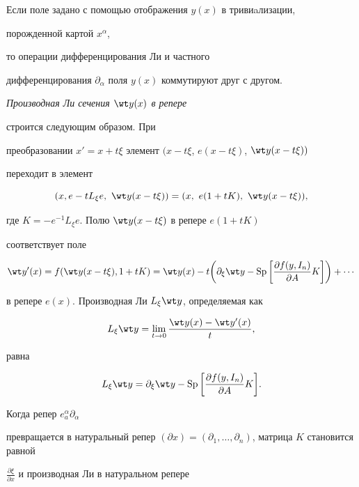 \begin{thm}


Если поле задано с помощью отображения $y(x)$ в тривиaлизации, 


порожденной картой $x^\alpha$,


то операции дифференцирования Ли и частного


дифференцирования $\partial_\alpha$ поля $y(x)$ коммутируют друг с другом.


\end{thm}





{\it Производная Ли сечения $\wt y(x)$ в репере} 


строится следующим образом. При 


преобразовании $x'=x+t\xi$ элемент $(x-t\xi$, $e(x-t\xi)$, $\wt y(x-t\xi))$ 


переходит в элемент


$$


(x,e-tL_\xi e,\ \wt y(x-t\xi))=(x,\ e(1+tK),\ \wt y(x-t\xi)),


$$


где $K=-e^{-1}L_\xi e$. Полю $\wt y(x-t\xi)$ в репере $e(1+tK)$ 


соответствует поле


$$


\wt y'(x)=f(\wt y(x-t\xi),1+tK)=\wt y(x)-t\bigg(\partial_\xi\wt y-\SP\bigg[ 


\frac{\partial f(y,I_n)}{\partial A}K\bigg]\bigg)+\dotsb


$$


в репере $e(x)$. Производная Ли $L_\xi\wt y$, определяемая как


$$


L_\xi\wt y=\lim_{t\to 0}\frac {\wt y(x)-\wt y'(x)}{t},


$$


равна


$$


L_\xi\wt y=\partial_\xi\wt y-


\SP\bigg[ \frac{\partial f(y,I_n)}{\partial A}K\bigg].


$$


Когда репер $e^\alpha_a\partial_\alpha$


превращается в натуральный репер $(\partial x)=(\partial_1,


\dotsc,\partial_n)$, матрица $K$ становится равной


$\frac{\partial\xi}{\partial x}$ и производная Ли в натуральном репере 


